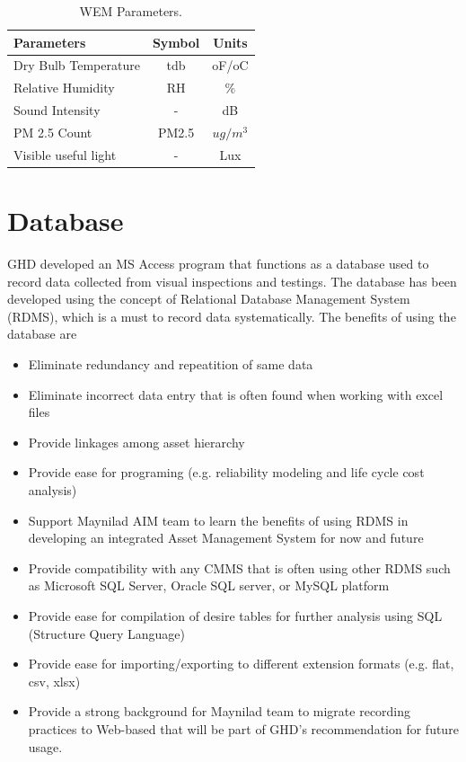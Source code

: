 \begin{table}[h]
	\caption{WEM Parameters.}
	\label{ch02_tbl_wemparameter}
	{\footnotesize
\begin{tabular}{l|l|l}
	\hline
	Parameters & \multicolumn{1}{c|}{Symbol} & \multicolumn{1}{c}{Units} \\ 
	\hline
	Dry Bulb Temperature & \multicolumn{1}{c|}{tdb} & \multicolumn{1}{c}{oF/oC} \\ 
	Relative Humidity & \multicolumn{1}{c|}{RH} & \multicolumn{1}{c}{\%} \\ 
	Sound Intensity & \multicolumn{1}{c|}{-} & \multicolumn{1}{c}{dB} \\ 
	PM 2.5 Count & \multicolumn{1}{c|}{PM2.5} & \multicolumn{1}{c}{$ug/m^3$} \\ 
	Visible useful light & \multicolumn{1}{c|}{-} & \multicolumn{1}{c}{Lux} \\ 
	\hline
\end{tabular}	
	}
\end{table}

\section{Database}
\label{24}
GHD developed an MS Access program that functions as a database used to record data collected from visual inspections and testings. The database has been developed using the concept of Relational Database Management System (RDMS), which is a must to record data systematically. The benefits of using the database are

\begin{itemize}
\item Eliminate redundancy and repeatition of same data
\item Eliminate incorrect data entry that is often found when working with excel files
\item Provide linkages among asset hierarchy
\item Provide ease for programing (e.g. reliability modeling and life cycle cost analysis)
\item Support Maynilad AIM team to learn the benefits of using RDMS in developing an integrated Asset Management System for now and future
\item Provide compatibility with any CMMS that is often using other RDMS such as Microsoft SQL Server, Oracle SQL server, or MySQL platform
\item Provide ease for compilation of desire tables for further analysis using SQL (Structure Query Language)
\item Provide ease for importing/exporting to different extension formats (e.g. flat, csv, xlsx)
\item Provide a strong background for Maynilad team to migrate recording practices to Web-based that will be part of GHD's recommendation for future usage.
\end{itemize}

